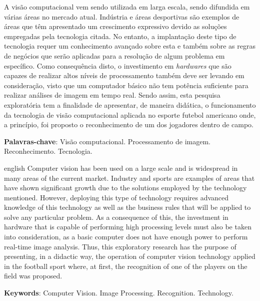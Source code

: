 \begin{resumo}[RESUMO]
A visão computacional vem sendo utilizada em larga escala, sendo difundida em várias áreas no mercado atual. Indústria e áreas desportivas são exemplos de áreas que têm apresentado um crescimento expressivo devido as soluções empregadas pela tecnologia citada. No entanto, a implantação deste tipo de tecnologia requer um conhecimento avançado sobre esta e também sobre as regras de negócios que serão aplicadas para a resolução de algum problema em específico. Como consequência disto, o investimento em \textit{hardwares} que são capazes de realizar altos níveis de processamento também deve ser levando em consideração, visto que um computador básico não tem potência suficiente para realizar análises de imagem em tempo real. Sendo assim, esta pesquisa exploratória tem a finalidade de apresentar, de maneira didática, o funcionamento da tecnologia de visão computacional aplicada no esporte futebol americano onde, a princípio, foi proposto o reconhecimento de um dos jogadores dentro de campo.

 \textbf{Palavras-chave}: Visão computacional. Processamento de imagem. Reconhecimento. Tecnologia.
\end{resumo}

\begin{resumo}[ABSTRACT]
 \begin{otherlanguage*}{english}
Computer vision has been used on a large scale and is widespread in many areas of the current market. Industry and sports are examples of areas that have shown significant growth due to the solutions employed by the technology mentioned. However, deploying this type of technology requires advanced knowledge of this technology as well as the business rules that will be applied to solve any particular problem. As a consequence of this, the investment in hardware that is capable of performing high processing levels must also be taken into consideration, as a basic computer does not have enough power to perform real-time image analysis. Thus, this exploratory research has the purpose of presenting, in a didactic way, the operation of computer vision technology applied in the football sport where, at first, the recognition of one of the players on the field was proposed.

   \noindent 
   \textbf{Keywords}: Computer Vision. Image Processing. Recognition. Technology.
 \end{otherlanguage*}
\end{resumo}